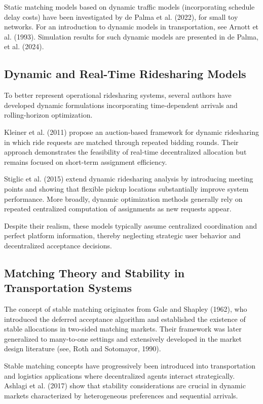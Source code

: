 \documentclass[11pt,a4paper]{article}
\begin{document}
Static matching models based on dynamic traffic models (incorporating schedule delay costs) have been investigated by de Palma et al. (2022), for small toy networks. For an introduction to dynamic models in transportation, see Arnott et al. (1993). Simulation results for such dynamic models are presented in de Palma, et al. (2024).

\subsection{Dynamic and Real-Time Ridesharing Models}
To better represent operational ridesharing systems, several authors have developed dynamic formulations incorporating time-dependent arrivals and rolling-horizon optimization.

Kleiner et al. (2011) propose an auction-based framework for dynamic ridesharing in which ride requests are matched through repeated bidding rounds. Their approach demonstrates the feasibility of real-time decentralized allocation but remains focused on short-term assignment efficiency.

Stiglic et al. (2015) extend dynamic ridesharing analysis by introducing meeting points and showing that flexible pickup locations substantially improve system performance. More broadly, dynamic optimization methods generally rely on repeated centralized computation of assignments as new requests appear.

Despite their realism, these models typically assume centralized coordination and perfect platform information, thereby neglecting strategic user behavior and decentralized acceptance decisions.
\newpage
\subsection{Matching Theory and Stability in Transportation Systems}
The concept of stable matching originates from Gale and Shapley (1962), who introduced the deferred acceptance algorithm and established the existence of stable allocations in two-sided matching markets. Their framework was later generalized to many-to-one settings and extensively developed in the market design literature (see, Roth and Sotomayor, 1990).

Stable matching concepts have progressively been introduced into transportation and logistics applications where decentralized agents interact strategically. Ashlagi et al. (2017) show that stability considerations are crucial in dynamic markets characterized by heterogeneous preferences and sequential arrivals.
\end{document}
